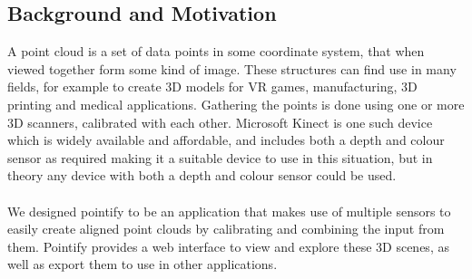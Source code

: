\documentclass{article}
\begin{document}
\subsection{Background and Motivation}
A point cloud is a set of data points in some coordinate system, that when viewed together form some kind of image. These structures can find use in many fields,
for example to create 3D models for VR games, manufacturing, 3D printing and medical applications. Gathering the points is done using one or more 3D scanners, calibrated with each other. Microsoft Kinect is one such device which is widely available and affordable, and includes both a depth and colour sensor as required making it a suitable device to use in this situation, but in theory any device with both a depth and colour sensor could be used.
\\\\
We designed pointify to be an application that makes use of multiple sensors to easily create aligned point clouds by calibrating and combining the input from them. Pointify provides a web interface to view and explore these 3D scenes, as well as export them to use in other applications.
\end{document}
